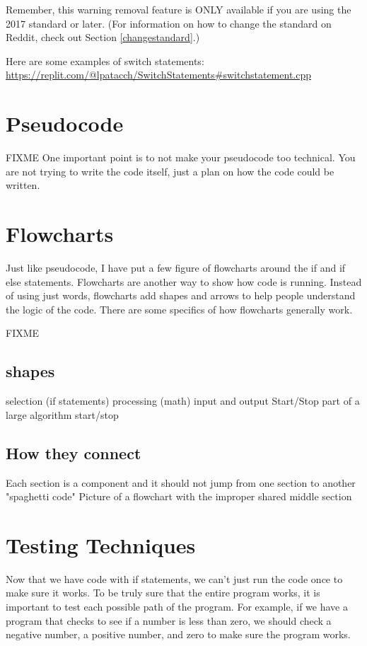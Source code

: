 Remember, this warning removal feature is ONLY available if you are using the 2017 standard or later. (For information on how to change the standard on Reddit, check out Section \ref{changestandard}.)


Here are some examples of switch statements: 
\url{https://replit.com/@lpatacch/SwitchStatements#switchstatement.cpp}
\section{Pseudocode}
FIXME
One important point is to not make your pseudocode too technical. You are not trying to write the code itself, just a plan on how the code could be written.

\section{Flowcharts}
Just like pseudocode, I have put a few figure of flowcharts around the if and if else statements. Flowcharts are another way to show how code is running. Instead of using just words, flowcharts add shapes and arrows to help people understand the logic of the code. There are some specifics of how flowcharts generally work.

FIXME
\subsection{shapes}
selection (if statements)
processing (math)
input and output
Start/Stop
part of a large algorithm start/stop
\subsection{How they connect}
Each section is a component and it should not jump from one section to another
"spaghetti code"
Picture of a flowchart with the improper shared middle section

\section{Testing Techniques}
Now that we have code with if statements, we can't just run the 
code once to make sure it works. To be truly sure that the entire
program works, it is important to test each possible path of the
program. For example, if we have a program that checks to see if
a number is less than zero, we should check a negative number, 
a positive number, and zero to make sure the program works. 

